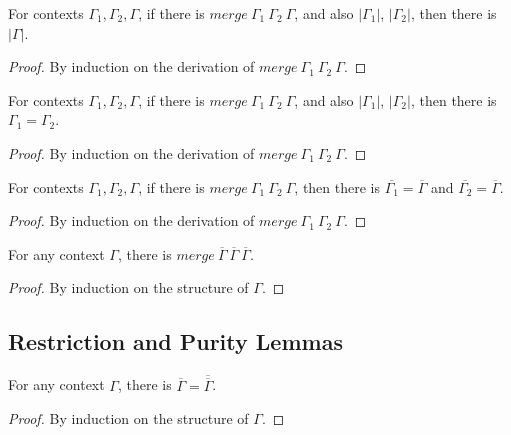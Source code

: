 \documentclass[sigplan,screen,review,anonymous]{acmart}
\newcommand{\pure}[1]{|#1|}
\newcommand{\mrg}[3]{merge\ {#1}\ {#2}\ {#3}}
\begin{document}
\begin{lemma}\label{mergepurepure}
  For contexts $\Gamma_1, \Gamma_2, \Gamma$, if there is $\mrg{\Gamma_1}{\Gamma_2}{\Gamma}$, and also $\pure{\Gamma_1}$, $\pure{\Gamma_2}$, then there is $\pure{\Gamma}$.
\end{lemma}
\begin{proof}
  By induction on the derivation of $\mrg{\Gamma_1}{\Gamma_2}{\Gamma}$.
\end{proof}

\begin{lemma}\label{mergepureeq}
  For contexts $\Gamma_1, \Gamma_2, \Gamma$, if there is $\mrg{\Gamma_1}{\Gamma_2}{\Gamma}$, and also $\pure{\Gamma_1}$, $\pure{\Gamma_2}$, then there is $\Gamma_1 = \Gamma_2$.
\end{lemma}
\begin{proof}
  By induction on the derivation of $\mrg{\Gamma_1}{\Gamma_2}{\Gamma}$.
\end{proof}

\begin{lemma}\label{mergerere}
  For contexts $\Gamma_1, \Gamma_2, \Gamma$, if there is $\mrg{\Gamma_1}{\Gamma_2}{\Gamma}$, then there is $\overline{\Gamma_1} = \overline{\Gamma}$ and $\overline{\Gamma_2} = \overline{\Gamma}$.
\end{lemma}
\begin{proof}
  By induction on the derivation of $\mrg{\Gamma_1}{\Gamma_2}{\Gamma}$.
\end{proof}

\begin{lemma}\label{mergererere}
  For any context $\Gamma$, there is $\mrg{\overline{\Gamma}}{\overline{\Gamma}}{\overline{\Gamma}}$.
\end{lemma}
\begin{proof}
  By induction on the structure of $\Gamma$.
\end{proof}

\subsection{Restriction and Purity Lemmas}

\begin{lemma}\label{rere}
  For any context $\Gamma$, there is $\overline{\Gamma} = \overline{\overline{\Gamma}}$.
\end{lemma}
\begin{proof}
  By induction on the structure of $\Gamma$.
\end{proof}
\end{document}
